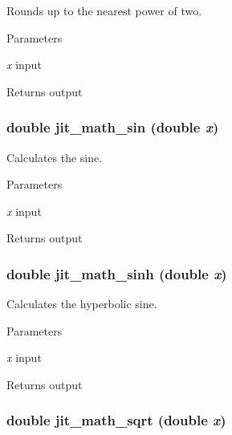 Rounds up to the nearest power of two. 
\begin{DoxyParams}{Parameters}
\item[{\em x}]input \end{DoxyParams}
\begin{DoxyReturn}{Returns}
output 
\end{DoxyReturn}
\hypertarget{group__mathmod_ga1e3fed4bd1ef0ab0332dbce530817c08}{
\subsubsection[{jit\_\-math\_\-sin}]{\setlength{\rightskip}{0pt plus 5cm}double jit\_\-math\_\-sin (double {\em x})}}
\label{group__mathmod_ga1e3fed4bd1ef0ab0332dbce530817c08}


Calculates the sine. 
\begin{DoxyParams}{Parameters}
\item[{\em x}]input \end{DoxyParams}
\begin{DoxyReturn}{Returns}
output 
\end{DoxyReturn}
\hypertarget{group__mathmod_ga38a13525c8bcadee6bd7c96530db65c5}{
\subsubsection[{jit\_\-math\_\-sinh}]{\setlength{\rightskip}{0pt plus 5cm}double jit\_\-math\_\-sinh (double {\em x})}}
\label{group__mathmod_ga38a13525c8bcadee6bd7c96530db65c5}


Calculates the hyperbolic sine. 
\begin{DoxyParams}{Parameters}
\item[{\em x}]input \end{DoxyParams}
\begin{DoxyReturn}{Returns}
output 
\end{DoxyReturn}
\hypertarget{group__mathmod_ga325567e295cd4a024acc2868bb5ed71f}{
\subsubsection[{jit\_\-math\_\-sqrt}]{\setlength{\rightskip}{0pt plus 5cm}double jit\_\-math\_\-sqrt (double {\em x})}}
\label{group__mathmod_ga325567e295cd4a024acc2868bb5ed71f}


